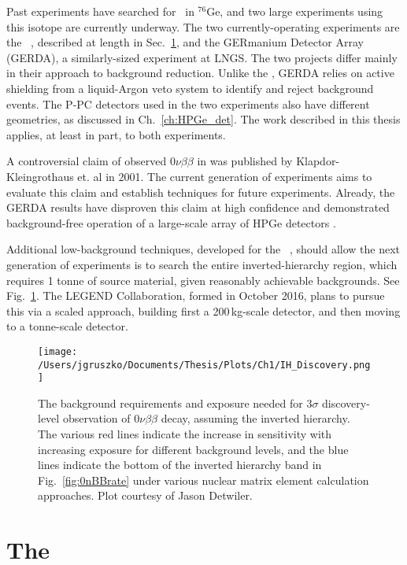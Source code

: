 Past experiments have searched for \nonubb\ in $^{76}$Ge, and two large experiments using this isotope are currently underway. The two currently-operating experiments are the \MJ\ \DEM, described at length in Sec.~\ref{sec:MJD}, and the GERmanium Detector Array (GERDA), a similarly-sized experiment at LNGS. The two projects differ mainly in their approach to background reduction. Unlike the \DEM, GERDA relies on active shielding from a liquid-Argon veto system to identify and reject background events. The P-PC detectors used in the two experiments also have different geometries, as discussed in Ch.~\ref{ch:HPGe_det}\cite{GERDA_Device2013}. The work described in this thesis applies, at least in part, to both experiments. 

A controversial claim of observed $0\nu\beta\beta$ in  was published by Klapdor-Kleingrothaus et. al in 2001\cite{KK2001}. The current generation of experiments aims to evaluate this claim and establish techniques for future experiments. Already, the GERDA results have disproven this claim at high confidence and demonstrated background-free operation of a large-scale array of HPGe detectors \cite{GERDA2017}. 

Additional low-background techniques, developed for the \MJ\ \DEM, should allow the next generation of experiments is to search the entire inverted-hierarchy region, which requires 1 tonne of source material, given reasonably achievable backgrounds. See Fig.~\ref{IH_Discovery}. The LEGEND Collaboration, formed in October 2016, plans to pursue this via a scaled approach, building first a 200\,kg-scale detector, and then moving to a tonne-scale detector.    

\begin{figure}[t]
\hfil \texttt{[image: /Users/jgruszko/Documents/Thesis/Plots/Ch1/IH\_Discovery.png]} \hfil
\caption{The background requirements and exposure needed for $3\sigma$ discovery-level observation of $0\nu\beta\beta$ decay, assuming the inverted hierarchy. The various red lines indicate the increase in sensitivity with increasing exposure for different background levels, and the blue lines indicate the bottom of the inverted hierarchy band in Fig.~\ref{fig:0nBBrate} under various nuclear matrix element calculation approaches. Plot courtesy of Jason Detwiler.}
\label{IH_Discovery}
\end{figure}

\section{The \MJ\ \DEM}\label{sec:MJD}

